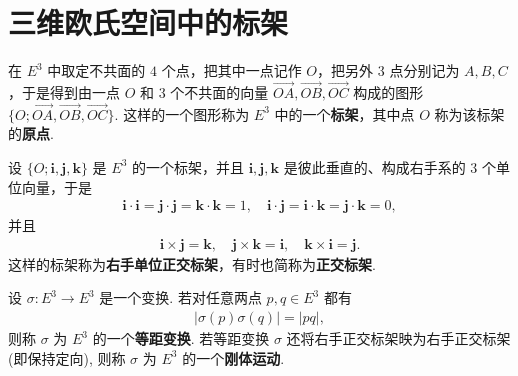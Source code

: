 \documentclass[../../main.tex]{subfiles}%
\begin{document}
\section{三维欧氏空间中的标架}

\begin{definition}[标架]
在 $E^3$ 中取定不共面的 $4$ 个点，把其中一点记作 $O$，把另外 $3$ 点分别记为 $A, B, C$，于是得到由一点 $O$ 和 $3$ 个不共面的向量 $\overrightarrow{OA}, \overrightarrow{OB}, \overrightarrow{OC}$ 构成的图形 $\{O; \overrightarrow{OA}, \overrightarrow{OB}, \overrightarrow{OC}\}$. 这样的一个图形称为 $E^3$ 中的一个\textbf{标架}，其中点 $O$ 称为该标架的\textbf{原点}.
\end{definition}

\begin{definition}[正交标架]
设 $\{O; \bm i, \bm j, \bm k\}$ 是 $E^3$ 的一个标架，并且 $\bm i, \bm j, \bm k$ 是彼此垂直的、构成右手系的 $3$ 个单位向量，于是
\begin{align*}
\bm i \cdot \bm i = \bm j \cdot \bm j = \bm k \cdot \bm k = 1,\quad \bm i \cdot \bm j = \bm i \cdot \bm k = \bm j \cdot \bm k = 0,
\end{align*}
并且
\begin{align*}
\bm i \times \bm j = \bm k,\quad \bm j \times \bm k = \bm i,\quad \bm k \times \bm i = \bm j.
\end{align*}
这样的标架称为\textbf{右手单位正交标架}，有时也简称为\textbf{正交标架}.
\end{definition}

\begin{definition}[等距变换和刚体运动]
设 $\sigma: E^3 \to E^3$ 是一个变换. 若对任意两点 $p,q\in E^3$ 都有
\begin{align*}
|\sigma(p)\sigma(q)| = |pq|,
\end{align*}
则称 $\sigma$ 为 $E^3$ 的一个\textbf{等距变换}. 若等距变换 $\sigma$ 还将右手正交标架映为右手正交标架 (即保持定向), 则称 $\sigma$ 为 $E^3$ 的一个\textbf{刚体运动}.
\end{definition}
\end{document}
